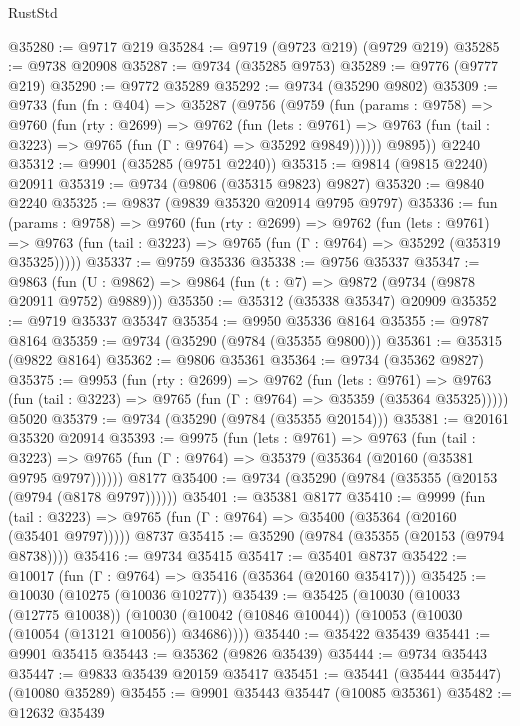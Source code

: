 \begin{lexlean}{RustStd}
\begin{coremodule}
@35280 := @9717 @219
@35284 := @9719 (@9723 @219) (@9729 @219)
@35285 := @9738 @20908
@35287 := @9734 (@35285 @9753)
@35289 := @9776 (@9777 @219)
@35290 := @9772 @35289
@35292 := @9734 (@35290 @9802)
@35309 := @9733
    (fun (fn : @404) =>
    @35287
      (@9756
        (@9759
          (fun (params : @9758) =>
          @9760
            (fun (rty : @2699) =>
            @9762
              (fun (lets : @9761) =>
              @9763 (fun (tail : @3223) => @9765 (fun (Γ : @9764) => @35292 @9849))))))
        @9895))
    @2240
@35312 := @9901 (@35285 (@9751 @2240))
@35315 := @9814 (@9815 @2240) @20911
@35319 := @9734 (@9806 (@35315 @9823) @9827)
@35320 := @9840 @2240
@35325 := @9837 (@9839 @35320 @20914 @9795 @9797)
@35336 := fun (params : @9758) =>
  @9760
    (fun (rty : @2699) =>
    @9762
      (fun (lets : @9761) =>
      @9763 (fun (tail : @3223) => @9765 (fun (Γ : @9764) => @35292 (@35319 @35325)))))
@35337 := @9759 @35336
@35338 := @9756 @35337
@35347 := @9863
    (fun (U : @9862) => @9864 (fun (t : @7) => @9872 (@9734 (@9878 @20911 @9752) @9889)))
@35350 := @35312 (@35338 @35347) @20909
@35352 := @9719 @35337 @35347
@35354 := @9950 @35336 @8164
@35355 := @9787 @8164
@35359 := @9734 (@35290 (@9784 (@35355 @9800)))
@35361 := @35315 (@9822 @8164)
@35362 := @9806 @35361
@35364 := @9734 (@35362 @9827)
@35375 := @9953
    (fun (rty : @2699) =>
    @9762
      (fun (lets : @9761) =>
      @9763 (fun (tail : @3223) => @9765 (fun (Γ : @9764) => @35359 (@35364 @35325)))))
    @5020
@35379 := @9734 (@35290 (@9784 (@35355 @20154)))
@35381 := @20161 @35320 @20914
@35393 := @9975
    (fun (lets : @9761) =>
    @9763
      (fun (tail : @3223) =>
      @9765 (fun (Γ : @9764) => @35379 (@35364 (@20160 (@35381 @9795 @9797))))))
    @8177
@35400 := @9734 (@35290 (@9784 (@35355 (@20153 (@9794 (@8178 @9797))))))
@35401 := @35381 @8177
@35410 := @9999
    (fun (tail : @3223) => @9765 (fun (Γ : @9764) => @35400 (@35364 (@20160 (@35401 @9797)))))
    @8737
@35415 := @35290 (@9784 (@35355 (@20153 (@9794 @8738))))
@35416 := @9734 @35415
@35417 := @35401 @8737
@35422 := @10017 (fun (Γ : @9764) => @35416 (@35364 (@20160 @35417)))
@35425 := @10030 (@10275 (@10036 @10277))
@35439 := @35425
    (@10030
      (@10033 (@12775 @10038))
      (@10030 (@10042 (@10846 @10044)) (@10053 (@10030 (@10054 (@13121 @10056)) @34686))))
@35440 := @35422 @35439
@35441 := @9901 @35415
@35443 := @35362 (@9826 @35439)
@35444 := @9734 @35443
@35447 := @9833 @35439 @20159 @35417
@35451 := @35441 (@35444 @35447) (@10080 @35289)
@35455 := @9901 @35443 @35447 (@10085 @35361)
@35482 := @12632
    @35439

\end{coremodule}
\end{lexlean}
